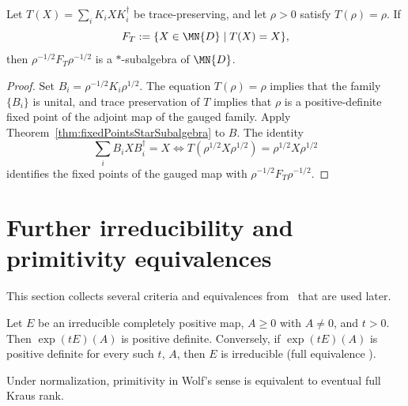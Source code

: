 \begin{theorem}%
    \label{thm:weightedFixedPointsStarSubalgebra}
    \leanok
    Let $T(X) = \sum_i K_i X K_i^\dagger$ be trace-preserving, and let
    $\rho > 0$ satisfy $T(\rho) = \rho$. If
    \[
        F_T := \{X \in \MN{D} \mid T(X) = X\},
    \]
    then $\rho^{-1/2} F_T \rho^{-1/2}$ is a $*$-subalgebra of $\MN{D}$.
\end{theorem}
\begin{proof}
    \leanok
    Set $B_i = \rho^{-1/2} K_i \rho^{1/2}$. The equation $T(\rho) = \rho$
    implies that the family $\{B_i\}$ is unital, and trace preservation of $T$
    implies that $\rho$ is a positive-definite fixed point of the adjoint map
    of the gauged family. Apply Theorem~\ref{thm:fixedPointsStarSubalgebra}
    to $B$. The identity
    \[
        \sum_i B_i X B_i^\dagger = X
        \iff
        T(\rho^{1/2} X \rho^{1/2}) = \rho^{1/2} X \rho^{1/2}
    \]
    identifies the fixed points of the gauged map with
    $\rho^{-1/2} F_T \rho^{-1/2}$.
\end{proof}

\section{Further irreducibility and primitivity equivalences}

This section collects several criteria and equivalences from~\cite[Theorems~6.2, 6.7, 6.8]{Wolf2012Quantum} that are
used later.

\begin{theorem}%
    \label{thm:wolf_6_2_item_3}
    \leanok
    Let $E$ be an irreducible completely positive map, $A \ge 0$ with
    $A \neq 0$, and $t > 0$. Then $\exp(tE)(A)$ is positive definite.
    Conversely, if $\exp(tE)(A)$ is positive definite for every such $t$, $A$,
    then $E$ is irreducible (full equivalence ).
\end{theorem}

\begin{theorem}%
    \label{thm:wolf_6_8_kraus_span}
    \leanok
    Under normalization, primitivity in Wolf's sense is equivalent to eventual
    full Kraus rank.
\end{theorem}

